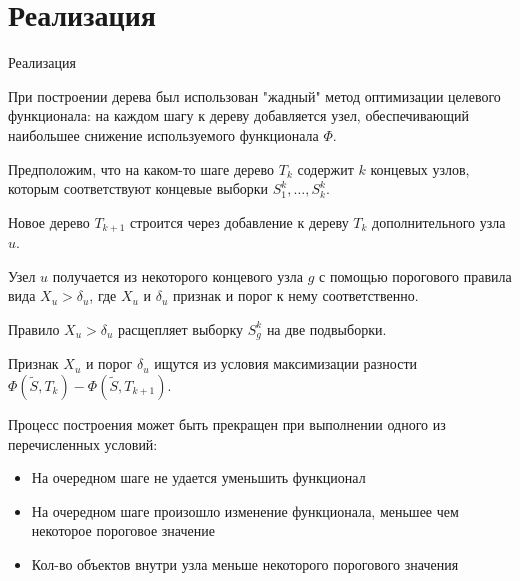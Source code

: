 \documentclass[10pt,pdf,hyperref={unicode}]{beamer}
\begin{document}
	\section{Реализация}
	\begin{frame}{Реализация}
	
	При построении дерева был использован "жадный" \space метод оптимизации целевого функционала: на каждом шагу к дереву добавляется узел, обеспечивающий наибольшее снижение используемого функционала $\Phi$.

	Предположим, что на каком-то шаге дерево $T_k$ содержит $k$ концевых узлов, которым соответствуют концевые выборки $S_1^k, \dots, S_k^k$.

	Новое дерево $T_{k + 1}$ строится через добавление к дереву $T_k$ дополнительного узла $u$.

	Узел $u$ получается из некоторого концевого узла $g$ с помощью порогового правила вида $X_u > \delta_u$, где $X_u$ и $\delta_u$ признак и порог к нему соответственно. 

	Правило $X_u > \delta_u$ расщепляет выборку $S_g^k$ на две подвыборки.

	Признак $X_u$ и порог $\delta_u$ ищутся из условия максимизации разности $\Phi(\tilde{S}, T_k) - \Phi(\tilde{S}, T_{k + 1})$.

	Процесс построения может быть прекращен при выполнении одного из перечисленных условий:

	\begin{itemize}
		\item На очередном шаге не удается уменьшить функционал
		\item На очередном шаге произошло изменение функционала, меньшее чем некоторое пороговое значение
		\item Кол-во объектов внутри узла меньше некоторого порогового значения
	\end{itemize}
	
	\end{frame}
	
\end{document}
